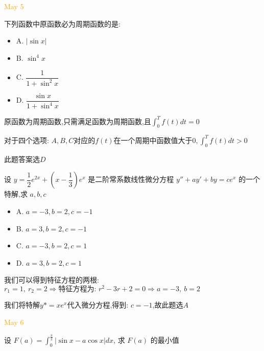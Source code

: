 \textcolor{orange}{May 5}

\begin{example}[][Exam: 31.1.9]
	下列函数中原函数必为周期函数的是: 
\begin{itemize}
	\item A. $|\sin x|$ 
	\item B. $\sin^4 x$ 
	\item C. $\dfrac{1}{1+\sin^2x}$ 
	\item D. $\dfrac{\sin x}{1+\sin^4 x}$ 
\end{itemize}
\end{example}

\begin{solution}
	
	原函数为周期函数,只需满足函数为周期函数,且$\int_{0}^{T}f(t)dt=0$
	
	对于四个选项: $A,B,C\text{对应的}f(t)\text{在一个周期中函数值大于0},\int_{0}^{T}f(t)dt>0$
	
	此题答案选$D$
\end{solution}

\begin{example}[][Exam: 31.1.10]
	设 $y=\dfrac{1}{2}e^{2x}+(x-\dfrac{1}{3})e^{x}$ 是二阶常系数线性微分方程 $y''+ay'+by=ce^x$ 的一个特解,求 $a,b,c$ 
\begin{itemize}
	\item A. $a=-3, b=2, c=-1$ 
	\item B. $a=3, b=2, c=-1$ 
	\item C. $a=-3, b=2, c=1$ 
	\item D. $a=3, b=2, c=1$ 
\end{itemize}
\end{example}

\begin{solution}
	
	我们可以得到特征方程的两根: $r_{1}=1,\ r_{2}=2\Rightarrow \text{特征方程为: }r^2-3r+2=0\Rightarrow a=-3,\ b=2$
	
	我们将特解$y{*}=xe^{x}$代入微分方程,得到: $c=-1$,故此题选$A$
\end{solution}


\textcolor{orange}{May 6}

\begin{example}[][Exam: 31.1.11]
	设 $F(a)=\int_{0}^{\frac{\pi}{2}}\big|\sin x-a\cos x\big|dx$, 求 $F(a)$ 的最小值
\end{example}

